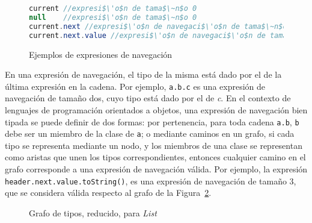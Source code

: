 \begin{figure}
	\begin{lstlisting}[mathescape=true, language=Java, extendedchars=true,basicstyle={}]
current //expresi$\'o$n de tama$\~n$o 0
null 	//expresi$\'o$n de tama$\~n$o 0
current.next //expresi$\'o$n de navegaci$\'o$n de tama$\~n$o 1
current.next.value //expresi$\'o$n de navegaci$\'o$n de tama$\~n$o 2
	\end{lstlisting}
	\caption{Ejemplos de expresiones de navegaci\'on}
	\label{figures.examples.chainedExpr}
\end{figure}

En una expresi\'on de navegaci\'on, el tipo de la misma est\'a dado por el de la \'ultima expresi\'on en la cadena. Por ejemplo, \lstinline|a.b.c| es una expresi\'on de navegaci\'on de tama\~no dos, cuyo tipo est\'a dado por el de \emph{c}. En el contexto de lenguajes de programaci\'on orientados a objetos, una expresi\'on de navegaci\'on bien tipada se puede definir de dos formas: por pertenencia, para toda cadena \texttt{a.b}, \texttt{b} debe ser un miembro de la clase de \texttt{a}; o mediante caminos en un grafo, si cada tipo se representa mediante un nodo, y los miembros de una clase se representan como aristas que unen los tipos correspondientes, entonces cualquier camino en el grafo corresponde a una expresi\'on de navegaci\'on v\'alida. Por ejemplo, la expresi\'on \lstinline|header.next.value.toString()|, es una expresi\'on de navegaci\'on de tama\~no 3, que se considera v\'alida respecto al grafo de la Figura~\ref{figures.examples.navigationExprGraph}.

\begin{figure}
	\begin{center}
		\usetikzlibrary{positioning}
	\end{center}
	\caption[Grafo de tipos para \emph{List}]{Grafo de tipos, reducido, para \emph{List}}
	\label{figures.examples.navigationExprGraph}
\end{figure}

